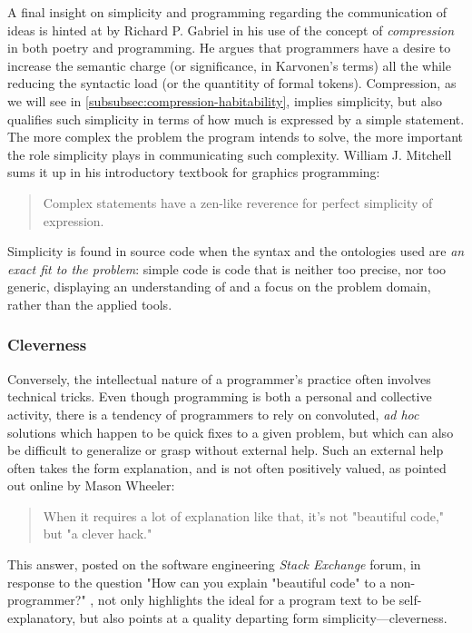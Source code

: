 A final insight on simplicity and programming regarding the communication of ideas is hinted at by Richard P. Gabriel in his use of the concept of \emph{compression} in both poetry and programming. He argues that programmers have a desire to increase the semantic charge (or significance, in Karvonen's terms) all the while reducing the syntactic load (or the quantitity of formal tokens). Compression, as we will see in \ref{subsubsec:compression-habitability}, implies simplicity, but also qualifies such simplicity in terms of how much is expressed by a simple statement. The more complex the problem the program intends to solve, the more important the role simplicity plays in communicating such complexity. William J. Mitchell sums it up in his introductory textbook for graphics programming:

\begin{quote}
  Complex statements have a zen-like reverence for perfect simplicity of expression. \citep{mitchell_art_1987}
\end{quote}

Simplicity is found in source code when the syntax and the ontologies used are \emph{an exact fit to the problem}: simple code is code that is neither too precise, nor too generic, displaying an understanding of and a focus on the problem domain, rather than the applied tools. 

\subsubsection{Cleverness}
\label{subsubsec:cleverness}

Conversely, the intellectual nature of a programmer's practice often involves technical tricks. Even though programming is both a personal and collective activity, there is a tendency of programmers to rely on convoluted, \emph{ad hoc} solutions which happen to be quick fixes to a given problem, but which can also be difficult to generalize or grasp without external help.
Such an external help often takes the form explanation, and is not often positively valued, as pointed out online by Mason Wheeler:

\begin{quote}
  When it requires a lot of explanation like that, it's not "beautiful code," but "a clever hack." \citep{stackoverflow_how_2013}
\end{quote}

This answer, posted on the software engineering \emph{Stack Exchange} forum, in response to the question "How can you explain "beautiful code" to a non-programmer?" \citep{stackoverflow_how_2013}, not only highlights the ideal for a program text to be self-explanatory, but also points at a quality departing form simplicity—cleverness.


